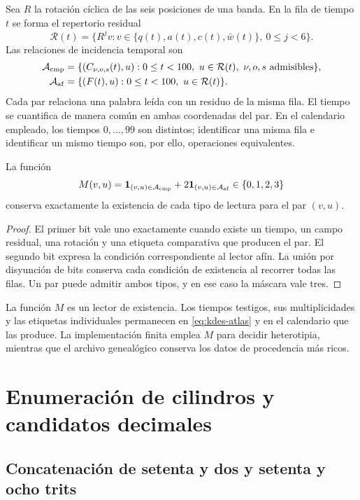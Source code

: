 Sea $R$ la rotación cíclica de las seis posiciones de una banda. En la
fila de tiempo $t$ se forma el repertorio residual
\[
 \mathcal R(t)=\{R^jv:
      v\in\{q(t),a(t),c(t),\bar w(t)\},\ 0\leq j<6\}.
\]
Las relaciones de incidencia temporal son
\begin{align}
 \mathcal A_{\rm cmp}
 &=\{(C_{\nu,o,s}(t),u):
      0\leq t<100,\ u\in\mathcal R(t),\ \nu,o,s\text{ admisibles}\},\\
 \mathcal A_{\rm af}
 &=\{(F(t),u):0\leq t<100,\ u\in\mathcal R(t)\}.
 \label{eq:kdes-atlas}
\end{align}
Cada par relaciona una palabra leída con un residuo de la misma fila.
El tiempo se cuantifica de manera común en ambas coordenadas del par.
En el calendario empleado, los tiempos $0,\ldots,99$ son distintos;
identificar una misma fila e identificar un mismo tiempo son, por ello,
operaciones equivalentes.

\begin{proposition}
La función
\[
 M(v,u)=\mathbf1_{(v,u)\in\mathcal A_{\rm cmp}}
        +2\mathbf1_{(v,u)\in\mathcal A_{\rm af}}
        \in\{0,1,2,3\}
\]
conserva exactamente la existencia de cada tipo de lectura para el par
$(v,u)$.
\end{proposition}
\begin{proof}
El primer bit vale uno exactamente cuando existe un tiempo, un campo
residual, una rotación y una etiqueta comparativa que producen el par.
El segundo bit expresa la condición correspondiente al lector afín.
La unión por disyunción de bits conserva cada condición de existencia
al recorrer todas las filas. Un par puede admitir ambos tipos, y en ese
caso la máscara vale tres.
\end{proof}

La función $M$ es un lector de existencia. Los tiempos testigos, sus
multiplicidades y las etiquetas individuales permanecen en
\eqref{eq:kdes-atlas} y en el calendario que las produce. La
implementación finita emplea $M$ para decidir heterotipia, mientras que
el archivo genealógico conserva los datos de procedencia más ricos.

\section{Enumeración de cilindros y candidatos decimales}

\subsection{Concatenación de setenta y dos y setenta y ocho trits}

